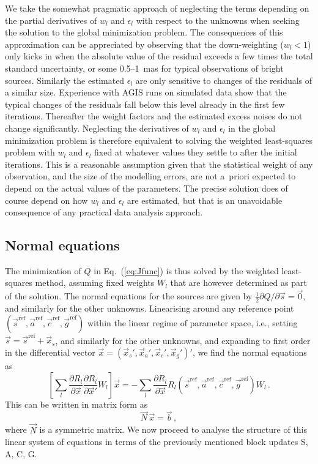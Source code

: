 \documentclass[structabstract]{aa}
\begin{document}
We take the somewhat pragmatic approach of neglecting the terms depending on
the partial derivatives of $w_l$ and $\epsilon_l$ with respect to the unknowns
when seeking the solution to the global minimization problem. The consequences
of this approximation can be appreciated by observing that the down-weighting
($w_l<1$) only kicks in when the absolute value of the residual exceeds a few
times the total standard uncertainty, or some 0.5--1~mas for typical observations of
bright sources. Similarly the estimated $\epsilon_l$ are only sensitive to changes of the 
residuals of a similar size. Experience with AGIS runs on simulated data show
that the typical changes of the residuals fall below this level already in the first few iterations. 
Thereafter
the weight factors and the estimated excess noises do not change significantly.
Neglecting the derivatives of $w_l$ and $\epsilon_l$ in the global minimization
problem is therefore equivalent to solving the weighted least-squares problem
with $w_l$ and $\epsilon_l$ fixed at whatever values they settle to after the
initial iterations. This is a reasonable assumption given that the statistical
weight of any observation, and the size of the modelling errors, are not
a~priori expected to depend on the actual values of the parameters. The
precise solution does of course depend on how $w_l$ and $\epsilon_l$ are
estimated, but that is an unavoidable consequence of any practical data
analysis approach.


\subsection{Normal equations} \label{sec:norm}

The minimization of $Q$ in Eq.~(\ref{eq:Jfunc}) is thus solved by the
weighted least-squares method, assuming fixed weights $W_l$ that are
however determined as
part of the solution. The normal equations for the sources are given by
$\frac{1}{2}\partial Q/\partial\vec{s}=\vec{0}$, and similarly for the
other unknowns. Linearising around any reference point
$(\vec{s}^\text{ref},\vec{a}^\text{ref},\vec{c}^\text{ref},\vec{g}^\text{ref})$
within the linear regime of parameter space, i.e., setting
$\vec{s}=\vec{s}^\text{ref}+\vec{x}_s$, and similarly for the other unknowns,
and expanding to first order in the differential vector
$\vec{x}=(\vec{x}_s',\vec{x}_a',\vec{x}_c',\vec{x}_g')'$, we find the normal
equations as
\begin{equation}\label{eq:norm}
\left[ \sum_l
\frac{\partial R_l}{\partial\vec{x}}\frac{\partial R_l}{\partial\vec{x}'}
W_l\right]\vec{x} = -\sum_l \frac{\partial R_l}{\partial\vec{x}}
R_l(\vec{s}^\text{ref},\vec{a}^\text{ref},\vec{c}^\text{ref},\vec{g}^\text{ref})W_l
\, .
\end{equation}
This can be written in matrix form as
\begin{equation}\label{eq:norm1}
\vec{N}\,\vec{x} = \vec{b} \, ,
\end{equation}
where $\vec{N}$ is a symmetric matrix. We now proceed to analyse the structure
of this linear system of equations in terms of the previously mentioned block
updates S, A, C, G.
\end{document}
